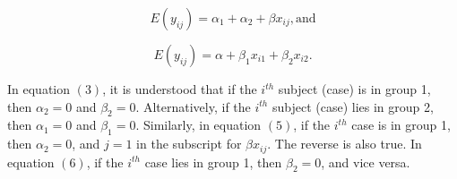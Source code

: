 \documentclass[11pt, oneside]{article}   	%
\begin{document}
\begin{equation}
E(y_{ij}) = \alpha_{1} + \alpha_{2} + \beta x_{ij}, \mbox{and}  
\end{equation}

\begin{equation}
E(y_{ij}) = \alpha + \beta_{1} x_{i1} + \beta_{2} x_{i2}.  
\end{equation}
\vspace{2 mm}

In equation $(3)$, it is understood that if the $i^{th}$ subject (case) is in group 1, then  $\alpha_{2} = 0 $ and $\beta_{2} = 0 $.  Alternatively, if the $i^{th}$ subject (case) lies in group 2, then $\alpha_{1} = 0 $ and $\beta_{1} = 0$.  Similarly, in equation $(5)$, if the $i^{th}$ case is in group 1, then $\alpha_{2} = 0 $, and  $ j = 1 $ in the subscript for $  \beta x_{ij}   $.  The reverse is also true.  In equation $(6)$, if the $i^{th}$ case lies in group 1, then $\beta_{2} = 0 $, and vice versa.   

\bigskip


\end{document}

